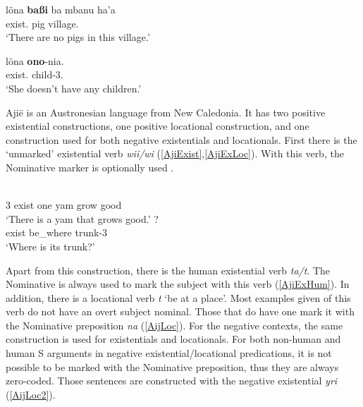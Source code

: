 \begin{exe} \ex\label{NiaNegExist}
\begin{xlist} \ex \gll l\"ona \textbf{ba{\ss}i} ba mbanu ha'a\\
exist.\Neg{} pig \loc{} village.\mut{} \prox{}\\
\glt `There are no pigs in this village.'

\ex \gll l\"ona \textbf{ono}-nia.\\
exist.\Neg{} child-3\sg{}.\poss{}\\
\glt `She doesn't have any children.'
\end{xlist} 
\end{exe}


Aji\"e is an Austronesian language from New Caledonia. 
It has two positive existential constructions, one positive locational construction, and one construction used for both negative existentials and locationals.
First there is the `unmarked' existential verb \emph{wii/wi} (\ref{AjiExist},\ref{AjiExLoc}).  
With this verb, the Nominative marker is optionally used \citep[109]{Lichtenberk:1978}.

\begin{exe}\ex{}
\begin{xlist}
\ex\label{AjiExist}\gll{}  \textbf{} \textbf{}   \\
3\sg{} exist one yam \relativ{} grow good\\
\glt `There is a yam that grows good.' 
\ex\label{AjiExLoc}\gll{}  \textbf{} \textbf{}?\\
exist be\_where \nom{} trunk-3\sg{}\\
\glt `Where is its trunk?' 
\end{xlist} 
\end{exe}

Apart from this construction, there is the human existential verb \emph{ta/t\textturnv}. 
The Nominative is always used to mark the subject with this verb (\ref{AjiExHum}). 
In addition, there is a locational verb \emph{t\textopeno} `be at a place'.
Most examples given of this verb do not have an overt subject nominal. 
Those that do have one mark it with the Nominative preposition \emph{na} (\ref{AijLoc}). 
For the negative contexts, the same construction is used for existentials and locationals.
For both non-human and human S arguments in negative existential/locational predications, it is not possible to be marked with the Nominative preposition, thus they are always zero-coded.
Those sentences are constructed with the negative existential \emph{y\textepsilon ri} (\ref{AijLoc2}). 

